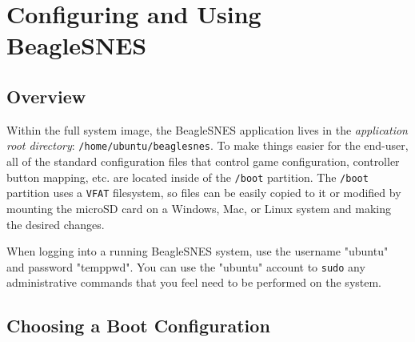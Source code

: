 \chapter{Configuring and Using BeagleSNES}

\section{Overview}

Within the full system image, the BeagleSNES application lives in the \emph{application root directory}: \texttt{/home/ubuntu/beaglesnes}. To make things easier for the end-user, all of the standard configuration files that control game configuration, controller button mapping, etc. are located inside of the \texttt{/boot} partition.  The \texttt{/boot} partition uses a \texttt{VFAT} filesystem, so files can be easily copied to it or modified by mounting the microSD card on a Windows, Mac, or Linux system and making the desired changes.  

\begin{updateWarn}
When logging into a running BeagleSNES system, use the username "ubuntu" and password "temppwd". You can use the "ubuntu" account to \texttt{sudo} any administrative commands that you feel need to be performed on the system.
\end{updateWarn}

\section{Choosing a Boot Configuration}

